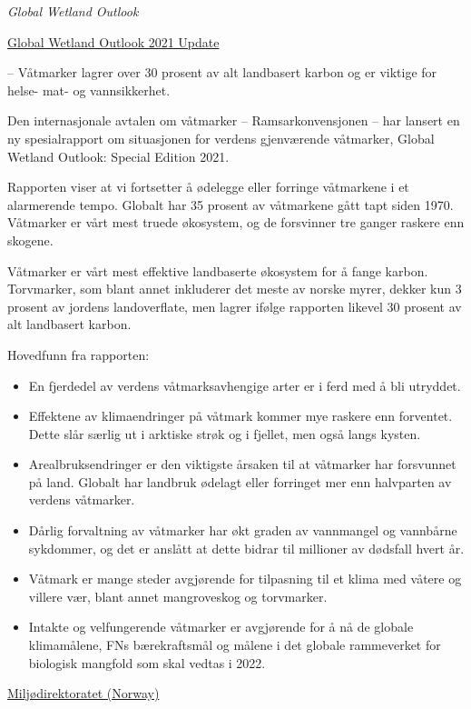 \documentclass[
]{book}
\providecommand{\tightlist}{%
  \setlength{\itemsep}{0pt}\setlength{\parskip}{0pt}}
\begin{document}
\emph{Global Wetland Outlook}

\href{https://www.global-wetland-outlook.ramsar.org/outlook}{Global Wetland Outlook 2021 Update}

-- Våtmarker lagrer over 30 prosent av alt landbasert karbon og er viktige for helse- mat- og vannsikkerhet.

Den internasjonale avtalen om våtmarker -- Ramsarkonvensjonen -- har lansert en ny spesialrapport om situasjonen for verdens gjenværende våtmarker, Global Wetland Outlook: Special Edition 2021.

Rapporten viser at vi fortsetter å ødelegge eller forringe våtmarkene i et alarmerende tempo. Globalt har 35 prosent av våtmarkene gått tapt siden 1970. Våtmarker er vårt mest truede økosystem, og de forsvinner tre ganger raskere enn skogene.

Våtmarker er vårt mest effektive landbaserte økosystem for å fange karbon. Torvmarker, som blant annet inkluderer det meste av norske myrer, dekker kun 3 prosent av jordens landoverflate, men lagrer ifølge rapporten likevel 30 prosent av alt landbasert karbon.

Hovedfunn fra rapporten:

\begin{itemize}
\tightlist
\item
  En fjerdedel av verdens våtmarksavhengige arter er i ferd med å bli utryddet.
\item
  Effektene av klimaendringer på våtmark kommer mye raskere enn forventet. Dette slår særlig ut i arktiske strøk og i fjellet, men også langs kysten.
\item
  Arealbruksendringer er den viktigste årsaken til at våtmarker har forsvunnet på land. Globalt har landbruk ødelagt eller forringet mer enn halvparten av verdens våtmarker.
\item
  Dårlig forvaltning av våtmarker har økt graden av vannmangel og vannbårne sykdommer, og det er anslått at dette bidrar til millioner av dødsfall hvert år.
\item
  Våtmark er mange steder avgjørende for tilpasning til et klima med våtere og villere vær, blant annet mangroveskog og torvmarker.
\item
  Intakte og velfungerende våtmarker er avgjørende for å nå de globale klimamålene, FNs bærekraftsmål og målene i det globale rammeverket for biologisk mangfold som skal vedtas i 2022.
\end{itemize}

\href{https://www.miljodirektoratet.no/aktuelt/nyheter/2021/desember-2021/vatmark-forsvinner-tre-ganger-raskere-enn-skogene/}{Miljødirektoratet (Norway)}
\end{document}

